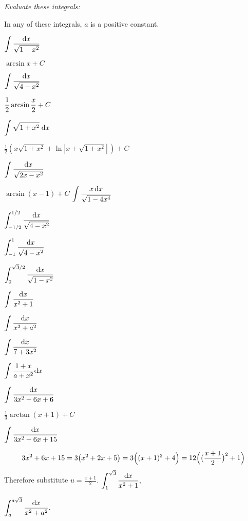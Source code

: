 \problemfont %
\begin{center}
  \textit{\color{badgerred}Evaluate these integrals:}
\end{center}
\begin{multicols}{3}
\noindent%
In any of these integrals, $a$ is a positive constant.

\problem $\displaystyle\int \frac{\mathrm{d} x}{\sqrt{1-x^2}} $ %

\answer %
$\arcsin x+C$
\endanswer

\problem $\displaystyle\int \frac{\mathrm{d} x}{\sqrt{4-x^2}} $ %

\answer %
$\displaystyle\frac12 \arcsin\frac x2 +C$
\endanswer

\problem $\displaystyle\int \sqrt{1+x^2}\;\mathrm{d} x$ %

\answer %
$\frac12 (x\sqrt{1+{x}^{2}} + \ln|x+\sqrt{1+x^2}|\,)+C$
\endanswer

\problem $\displaystyle\int \frac{\mathrm{d} x}{\sqrt{2x-x^2}} $ %

\answer %
$\arcsin(x-1)+C$
\endanswer
\problem $\displaystyle\int \frac{x\,\mathrm{d} x}{\sqrt{1-4x^4}}  $ %

\problem $\displaystyle\int^{1/2}_{-1/2} \frac{\mathrm{d} x}{\sqrt{4-x^2}} $ %

\problem $\displaystyle\int^{1}_{-1} \frac{\mathrm{d} x}{\sqrt{4-x^2}} $ %

\problem $\displaystyle\int_0^{\sqrt{3}/2} \frac{\mathrm{d} x}{\sqrt{1-x^2}} $ %

\problem $\displaystyle\int \frac{\mathrm{d} x}{ x^2+1}$ %

\problem $\displaystyle\int \frac{\mathrm{d} x}{ x^2+a^2}$ %

\problem $\displaystyle\int \frac{\mathrm{d} x}{ 7+3x^2}$ %

\problem $\displaystyle\int \frac{1+x}{a+x^2} \mathrm{d} x$ %

\problem $\displaystyle\int \frac{\mathrm{d} x}{3x^2+6x+6}$ %

\answer %
$\frac13 \arctan(x+1)+C$
\endanswer

\problem $\displaystyle\int \frac{\mathrm{d} x}{3x^2+6x+15}$ %

\answer %
\[
3x^2+6x+15 = 3 \bigl(x^2+2x+5\bigr) = 3\Bigl( (x+1)^2 + 4\Bigr) = 
12 \Bigl(\bigl(\frac{x+1}{2}\bigr)^2 + 1\Bigr)
\]
Therefore substitute $u = \frac{x+1}{2}$.
\endanswer
\problem $\displaystyle\int^{\sqrt 3}_1 \frac{\mathrm{d} x}{ x^2+1}, $ %

\problem $\displaystyle\int^{a\sqrt 3}_a\frac{\mathrm{d} x}{ x^2+a^2}. $ %

\end{multicols}

\noproblemfont

